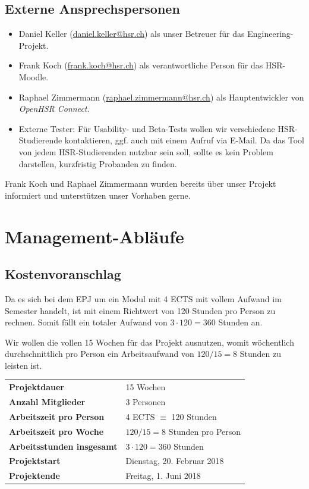 \documentclass[a4paper]{article}
\let\oldsection\section
\renewcommand\section{\clearpage\oldsection}
\begin{document}
\pagebreak
\subsection{Externe Ansprechspersonen}


\begin{itemize}
  \item Daniel Keller (\url{daniel.keller@hsr.ch}) als unser Betreuer für das Engineering-Projekt.
  \item Frank Koch (\url{frank.koch@hsr.ch}) als verantwortliche Person für das HSR-Moodle.
  \item Raphael Zimmermann (\url{raphael.zimmermann@hsr.ch}) als Hauptentwickler
    von \emph{OpenHSR Connect}.
  \item Externe Tester: Für Usability- und Beta-Tests wollen wir verschiedene
    HSR-Studierende kontaktieren, ggf. auch mit einem Aufruf via E-Mail. Da das Tool von jedem HSR-Studierenden nutzbar sein soll, sollte es kein Problem darstellen, kurzfristig Probanden zu finden.
\end{itemize}

Frank Koch und Raphael Zimmermann wurden bereits über unser Projekt informiert
und unterstützen unser Vorhaben gerne.

\section{Management-Abläufe}
\subsection{Kostenvoranschlag}

Da es sich bei dem EPJ um ein Modul mit 4 ECTS mit vollem Aufwand im Semester handelt, ist mit einem Richtwert von 120 Stunden pro Person zu rechnen. Somit fällt ein totaler Aufwand von $3 \cdot 120 = 360$ Stunden an.

Wir wollen die vollen 15 Wochen für das Projekt ausnutzen, womit wöchentlich
durchschnittlich pro Person ein Arbeitsaufwand von $120 / 15 = 8$ Stunden zu
leisten ist. \\[3em]

\begin{tabular}{ll}
  \textbf{Projektdauer} & 15 Wochen \\
  \textbf{Anzahl Mitglieder} & 3 Personen \\
  \textbf{Arbeitszeit pro Person} & 4 ECTS $\equiv$ 120 Stunden \\
  \textbf{Arbeitszeit pro Woche} & $120 / 15 = 8$ Stunden pro Person \\
  \textbf{Arbeitsstunden insgesamt} & $3 \cdot 120 = 360$ Stunden \\
  \textbf{Projektstart} & Dienstag, 20. Februar 2018 \\
  \textbf{Projektende} & Freitag, 1. Juni 2018
\end{tabular}
\end{document}

